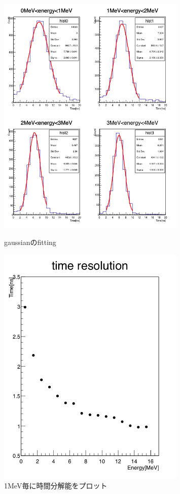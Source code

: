 \begin{figure}[H]%
  \begin{minipage}{0.5\hsize}
    \centering
    \includegraphics[width  = 0.8\textwidth]{figure/mino/gausfitting_ratio.png}
    \caption{gaussianのfitting}
    \label{fig:NaI_peak_gaus_fitting}
  \end{minipage}
  \begin{minipage}{0.5\hsize}
    \centering
    \includegraphics[width  = 0.8\textwidth]{figure/mino/timeresolution_ratio.png}
    \caption{1MeV毎に時間分解能をプロット}
    \label{fig:NaI_peak_time_resolution}
  \end{minipage}
\end{figure}

